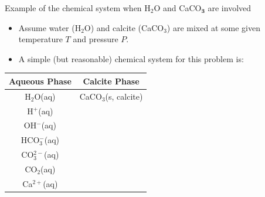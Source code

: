 %
\begin{frame}{Example of the chemical system when H$_{2}$O and CaCO$_{\boldsymbol{3}}$
are involved}
\begin{itemize}
\item Assume water (H$_{2}$O) and calcite (CaCO$_{3}$) are mixed at some
given temperature $T$ and pressure $P$. 
\item A simple (but reasonable) chemical system for this problem is:
\end{itemize}
\begin{center}
\begin{tabular}{cc}
\toprule 
\multicolumn{1}{c}{\textbf{Aqueous Phase}} & \textbf{Calcite Phase}\tabularnewline
\midrule
H$_{2}$O(aq) & CaCO$_{3}$(s, calcite)\tabularnewline
H$^{+}$(aq) & \tabularnewline
OH$^{-}$(aq) & \tabularnewline
HCO$_{3}^{-}$(aq) & \tabularnewline
CO$_{3}^{2-}$(aq) & \tabularnewline
CO$_{2}$(aq) & \tabularnewline
Ca$^{2+}$(aq)  & \tabularnewline
\bottomrule
\end{tabular}
\par\end{center}

\end{frame}
%
%
